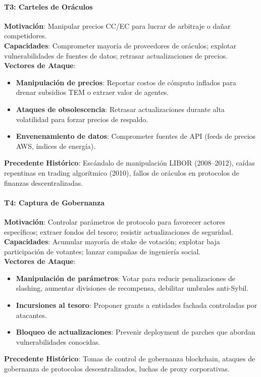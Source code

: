 \documentclass[11pt]{article}
\begin{document}
\paragraph{T3: Carteles de Oráculos}
\textbf{Motivación}: Manipular precios CC/EC para lucrar de arbitraje o dañar competidores.\\
\textbf{Capacidades}: Comprometer mayoría de proveedores de oráculos; explotar vulnerabilidades de fuentes de datos; retrasar actualizaciones de precios.\\
\textbf{Vectores de Ataque}:
\begin{itemize}[noitemsep]
  \item \textbf{Manipulación de precios}: Reportar costos de cómputo inflados para drenar subsidios TEM o extraer valor de agentes.
  \item \textbf{Ataques de obsolescencia}: Retrasar actualizaciones durante alta volatilidad para forzar precios de respaldo.
  \item \textbf{Envenenamiento de datos}: Comprometer fuentes de API (feeds de precios AWS, índices de energía).
\end{itemize}
\textbf{Precedente Histórico}: Escándalo de manipulación LIBOR (2008--2012), caídas repentinas en trading algorítmico (2010), fallos de oráculos en protocolos de finanzas descentralizadas.

\paragraph{T4: Captura de Gobernanza}
\textbf{Motivación}: Controlar parámetros de protocolo para favorecer actores específicos; extraer fondos del tesoro; resistir actualizaciones de seguridad.\\
\textbf{Capacidades}: Acumular mayoría de stake de votación; explotar baja participación de votantes; lanzar campañas de ingeniería social.\\
\textbf{Vectores de Ataque}:
\begin{itemize}[noitemsep]
  \item \textbf{Manipulación de parámetros}: Votar para reducir penalizaciones de slashing, aumentar divisiones de recompensa, debilitar umbrales anti-Sybil.
  \item \textbf{Incursiones al tesoro}: Proponer grants a entidades fachada controladas por atacantes.
  \item \textbf{Bloqueo de actualizaciones}: Prevenir deployment de parches que abordan vulnerabilidades conocidas.
\end{itemize}
\textbf{Precedente Histórico}: Tomas de control de gobernanza blockchain, ataques de gobernanza de protocolos descentralizados, luchas de proxy corporativas.
\end{document}
